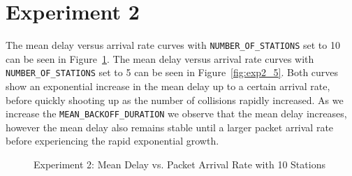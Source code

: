 \section*{Experiment 2}
The mean delay versus arrival rate curves with \texttt{NUMBER\_OF\_STATIONS} set to 10 can be seen in Figure~\ref{fig:exp2_10}. The mean delay versus arrival rate curves with \texttt{NUMBER\_OF\_STATIONS} set to 5 can be seen in Figure~\ref{fig:exp2_5}. Both curves show an exponential increase in the mean delay up to a certain arrival rate, before quickly shooting up as the number of collisions rapidly increased. As we increase the \texttt{MEAN\_BACKOFF\_DURATION} we observe that the mean delay increases, however the mean delay also remains stable until a larger packet arrival rate before experiencing the rapid exponential growth.

\begin{figure}[htp]
\centering
{}
\caption{Experiment 2: Mean Delay vs. Packet Arrival Rate with 10 Stations}
\label{fig:exp2_10}
\end{figure}

